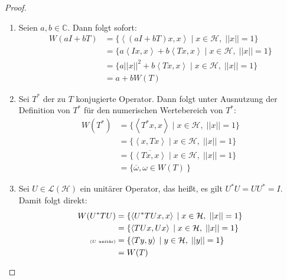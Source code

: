 \begin{proof}
	\begin{enumerate}[label= (\roman*)]
		\item Seien $a, b \in \mathbb{C}$. Dann folgt sofort:
		\begin{align}
			W(a I + b T) & = \{ \left< (a I + b T)x,x \right> \; | \; x \in \mathcal{H},\; ||x||=1 \} \nonumber \\
			& = \{ a \left< Ix,x \right> + b \left< Tx,x \right> \; | \; x \in \mathcal{H},\; ||x||=1 \} \nonumber \\
			& = \{ a ||x||^2 + b \left< Tx,x \right> \; | \; x \in \mathcal{H},\; ||x||=1 \} \nonumber \\
			& = a+ b W(T)
		\end{align} 
		\item Sei $T^*$ der zu $T$ konjugierte Operator. Dann folgt unter Ausnutzung der Definition von $T^*$ für den numerischen Wertebereich von $T^*$:
		\begin{align}
			W(T^*) & = \{ \left< T^*x,x \right> \; | \; x \in \mathcal{H},\; ||x||=1 \} \nonumber \\
				& = \{ \left< x,Tx \right> \; | \; x \in \mathcal{H},\; ||x||=1 \} \nonumber \\
				& = \{ \overline{ \left< Tx,x \right> } \; | \; x \in \mathcal{H},\; ||x||=1 \} \nonumber \\
				& = \{ \overline{\omega}, \omega \in W(T)\ \}
		\end{align}
		\item Sei $U \in \mathcal{L}(\mathcal{H})$ ein unitärer Operator, das heißt, es gilt $U^*U = UU^*=I$. Damit folgt direkt:
		\begin{align}
			W(U^*TU) & = \{ \left< U^*TUx,x \right> \; | \; x \in \mathcal{H},\; ||x||=1 \} \nonumber \\
				& = \{ \left< TUx,Ux \right> \; | \; x \in \mathcal{H},\; ||x||=1 \} \nonumber \\
				\text{ \tiny ($U$ unitär)} &= \{ \left< Ty,y \right> \; | \; y \in \mathcal{H},\; ||y||=1 \} \nonumber \\
				& = W(T)
		\end{align}
	\end{enumerate}
\end{proof}

